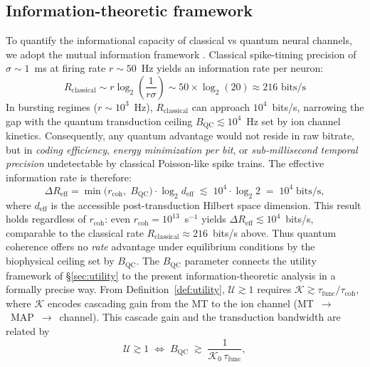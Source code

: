 \documentclass[twocolumn,10pt]{article}
\begin{document}
\subsection{Information-theoretic framework}
To quantify the informational capacity of classical vs quantum neural
channels, we adopt the mutual information framework
\cite{Borst1999,Strong1998}. Classical spike-timing precision of
$\sigma \sim 1$~ms at firing rate $r \sim 50$~Hz yields an information
rate per neuron:
\begin{equation}
R_{\text{classical}} \sim r \log_2\!\left(\frac{1}{r\sigma}\right)
\sim 50 \times \log_2(20) \approx 216 \text{~bits/s}
\end{equation}
In bursting regimes ($r \sim 10^3$~Hz), $R_{\text{classical}}$ can approach $10^4$~bits/s, narrowing the gap with the quantum transduction ceiling $B_{\text{QC}} \lesssim 10^4$~Hz set by ion channel kinetics. Consequently, any quantum advantage would not reside in raw bitrate, but in \textit{coding efficiency}, \textit{energy minimization per bit}, or \textit{sub-millisecond temporal precision} undetectable by classical Poisson-like spike trains. The effective information rate is therefore:
\begin{equation}
\Delta R_{\text{eff}} = \min\!\bigl(r_{\text{coh}},\;B_{\text{QC}}\bigr)
\cdot \log_2 d_{\text{eff}}
\;\lesssim\; 10^4 \cdot \log_2 2 \;=\; 10^4\;\text{bits/s},
\label{eq:DeltaR_eff}
\end{equation}
where $d_{\text{eff}}$ is the accessible post-transduction Hilbert space
dimension. This result holds regardless of $r_{\text{coh}}$: even
$r_{\text{coh}} = 10^{13}$~s$^{-1}$ yields $\Delta R_{\text{eff}}
\lesssim 10^4$~bits/s, comparable to the classical rate
$R_{\text{classical}} \approx 216$~bits/s above. Thus quantum coherence
offers no \emph{rate} advantage under equilibrium conditions by the
biophysical ceiling set by $B_{\text{QC}}$.
The $B_{\text{QC}}$ parameter connects the utility framework of
\S\ref{sec:utility} to the present information-theoretic analysis in a
formally precise way. From Definition~\ref{def:utility},
$\mathcal{U} \gtrsim 1$ requires $\mathcal{K} \gtrsim
\tau_{\text{func}}/\tau_{\text{coh}}$, where $\mathcal{K}$ encodes
cascading gain from the MT to the ion channel (MT~$\to$~MAP~$\to$~channel).
This cascade gain and the transduction bandwidth are related by
\begin{equation}
\mathcal{U} \gtrsim 1 \;\iff\;
B_{\text{QC}} \;\gtrsim\; \frac{1}{\mathcal{K}_0\,\tau_{\text{func}}},
\label{eq:U_BQC}
\end{equation}
\end{document}
